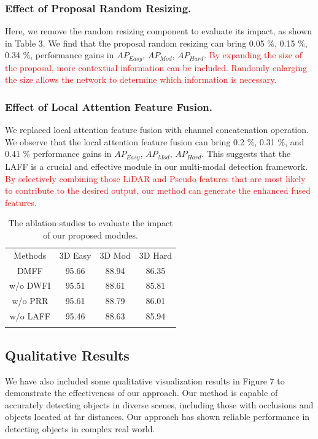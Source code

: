 \begin{sloppypar}
\subsubsection{Effect of Proposal Random Resizing.}
Here, we remove the random resizing component to evaluate its impact, as shown in Table 3. We find that the proposal random resizing can bring 0.05 $\%$, 0.15 $\%$, 0.34 $\%$, performance gains in
 $AP_{Easy}$,  $AP_{Mod}$, $AP_{Hard}$.  \textcolor{red}{ By expanding the size of the proposal, more contextual information can be included. Randomly enlarging the size allows the network to determine which information is necessary.}
 \subsubsection{Effect of Local Attention Feature Fusion.}
 We replaced local attention feature fusion with channel concatenation operation. We observe that the local attention feature fusion can bring 0.2 $\%$, 0.31 $\%$, and 0.41 $\%$ performance gains in $AP_{Easy}$,  $AP_{Mod}$, $AP_{Hard}$. This suggests that the LAFF is a crucial and effective module in our multi-modal detection framework. \textcolor{red}{By selectively combining those LiDAR and Pseudo features that are most likely to contribute to the desired output, our method can generate the enhanced fused features.}

 \begin{table}[!t]
\renewcommand{\arraystretch}{1.3}
\setlength\tabcolsep{15pt}%
\caption{The ablation studies to evaluate the impact of our proposed modules.}
\label{table3}
\centering
\begin{tabular}{cccc}
\hline\noalign{\smallskip}
Methods & 3D Easy & 3D Mod & 3D Hard \\
\noalign{\smallskip}\hline\noalign{\smallskip}
DMFF & 95.66 & 88.94 & 86.35 \\
w/o DWFI & 95.51 & 88.61 & 85.81 \\
w/o PRR & 95.61 & 88.79 & 86.01\\
w/o LAFF & 95.46 & 88.63 & 85.94 \\
\noalign{\smallskip}\hline
\end{tabular}
\end{table}

\subsection{Qualitative Results}
We have also included some qualitative visualization results in Figure 7 to demonstrate the effectiveness of our approach. Our method is capable of accurately detecting objects in diverse scenes, including those with occlusions and objects located at far distances. Our approach has shown reliable performance in detecting objects in complex real world.


\end{sloppypar}
